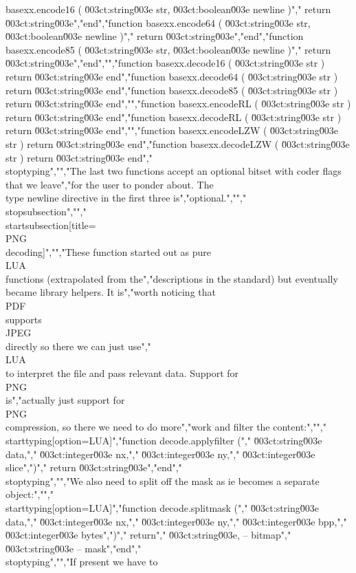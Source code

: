 basexx.encode16  ( \u003ct:string\u003e str, \u003ct:boolean\u003e newline )","    return \u003ct:string\u003e","end","function basexx.encode64  ( \u003ct:string\u003e str, \u003ct:boolean\u003e newline )","    return \u003ct:string\u003e","end","function basexx.encode85  ( \u003ct:string\u003e str, \u003ct:boolean\u003e newline )","    return \u003ct:string\u003e","end","","function basexx.decode16  ( \u003ct:string\u003e str ) return \u003ct:string\u003e end","function basexx.decode64  ( \u003ct:string\u003e str ) return \u003ct:string\u003e end","function basexx.decode85  ( \u003ct:string\u003e str ) return \u003ct:string\u003e end","","function basexx.encodeRL  ( \u003ct:string\u003e str ) return \u003ct:string\u003e end","function basexx.decodeRL  ( \u003ct:string\u003e str ) return \u003ct:string\u003e end","","function basexx.encodeLZW ( \u003ct:string\u003e str ) return \u003ct:string\u003e end","function basexx.decodeLZW ( \u003ct:string\u003e str ) return \u003ct:string\u003e end","\\stoptyping","","The last two functions accept an optional bitset with coder flags that we leave","for the user to ponder about. The \\type {newline} directive in the first three is","optional.","","\\stopsubsection","","\\startsubsection[title=\\PNG\\ decoding]","","These function started out as pure \\LUA\\ functions (extrapolated from the","descriptions in the standard) but eventually became library helpers. It is","worth noticing that \\PDF\\ supports \\JPEG\\ directly so there we can just use","\\LUA\\ to interpret the file and pass relevant data. Support for \\PNG\\ is","actually just support for \\PNG\\ compression, so there we need to do more","work and filter the content:","","\\starttyping[option=LUA]","function decode.applyfilter (","    \u003ct:string\u003e  data,","    \u003ct:integer\u003e nx,","    \u003ct:integer\u003e ny,","    \u003ct:integer\u003e slice",")","    return \u003ct:string\u003e","end","\\stoptyping","","We also need to split off the mask as ie becomes a separate object:","","\\starttyping[option=LUA]","function decode.splitmask (","    \u003ct:string\u003e  data,","    \u003ct:integer\u003e nx,","    \u003ct:integer\u003e ny,","    \u003ct:integer\u003e bpp,","    \u003ct:integer\u003e bytes",")","    return","        \u003ct:string\u003e, -- bitmap","        \u003ct:string\u003e  -- mask","end","\\stoptyping","","If present we have to 